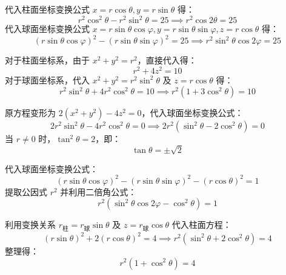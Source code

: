 \begin{solution}
    代入柱面坐标变换公式 $x = r \cos \theta, y = r \sin \theta$ 得：
    \begin{equation}
        r^2 \cos^2 \theta - r^2 \sin^2 \theta = 25 \implies \boxed{r^2 \cos 2\theta = 25}
    \end{equation}
    代入球面坐标变换公式 $x = r \sin \theta \cos \varphi, y = r \sin \theta \sin \varphi, z = r \cos \theta$ 得：
    \begin{equation}
        (r \sin \theta \cos \varphi)^2 - (r \sin \theta \sin \varphi)^2 = 25 \implies \boxed{r^2 \sin^2 \theta \cos 2\varphi = 25}
    \end{equation}

    对于柱面坐标系，由于 $x^2 + y^2 = r^2$，直接代入得：
    \begin{equation}
        \boxed{r^2 + 4z^2 = 10}
    \end{equation}
    对于球面坐标系，代入 $x^2 + y^2 = r^2 \sin^2 \theta$ 及 $z = r \cos \theta$ 得：
    \begin{equation}
        r^2 \sin^2 \theta + 4r^2 \cos^2 \theta = 10 \implies \boxed{r^2 (1 + 3\cos^2 \theta) = 10}
    \end{equation}

    原方程变形为 $2(x^2 + y^2) - 4z^2 = 0$，代入球面坐标变换公式：
    \begin{equation}
        2r^2 \sin^2 \theta - 4r^2 \cos^2 \theta = 0 \implies 2r^2 (\sin^2 \theta - 2\cos^2 \theta) = 0
    \end{equation}
    当 $r \neq 0$ 时，$\tan^2 \theta = 2$，即：
    \begin{equation}
        \boxed{\tan \theta = \pm \sqrt{2}}
    \end{equation}

    代入球面坐标变换公式：
    \begin{equation}
        (r \sin \theta \cos \varphi)^2 - (r \sin \theta \sin \varphi)^2 - (r \cos \theta)^2 = 1
    \end{equation}
    提取公因式 $r^2$ 并利用二倍角公式：
    \begin{equation}
        \boxed{r^2 (\sin^2 \theta \cos 2\varphi - \cos^2 \theta) = 1}
    \end{equation}

    利用变换关系 $r_{\text{柱}} = r_{\text{球}} \sin \theta$ 及 $z = r_{\text{球}} \cos \theta$ 代入柱面方程：
    \begin{equation}
        (r \sin \theta)^2 + 2(r \cos \theta)^2 = 4 \implies r^2 (\sin^2 \theta + 2\cos^2 \theta) = 4
    \end{equation}
    整理得：
    \begin{equation}
        \boxed{r^2 (1 + \cos^2 \theta) = 4}
    \end{equation}


\end{solution}
